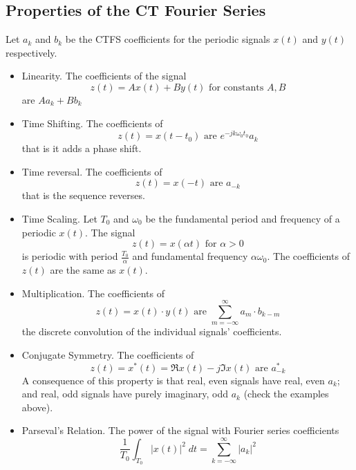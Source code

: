 \subsection{Properties of the CT Fourier Series}

Let $a_k$ and $b_k$ be the CTFS coefficients for the periodic signals $x(t)$ and $y(t)$ respectively.

\begin{itemize}
\item Linearity. The coefficients of the signal
  \[
  z(t) = Ax(t) + By(t) \mbox{ for constants } A,B 
  \]
  are $Aa_k + Bb_k$
\item Time Shifting. The coefficients of
  \[
  z(t) = x(t-t_0) \mbox{ are } e^{-jk\omega_0 t_0}a_k
  \]
  that is it adds a phase shift.
\item Time reversal. The coefficients of
  \[
  z(t) = x(-t) \mbox{ are } a_{-k}
  \]
  that is the sequence reverses.
\item Time Scaling. Let $T_0$ and $\omega_0$ be the fundamental period and frequency of a periodic $x(t)$. The signal 
  \[
  z(t) = x(\alpha t) \mbox{ for } \alpha > 0
  \]
  is periodic with period $\frac{T_0}{\alpha}$ and fundamental frequency $\alpha\omega_0$.
  The coefficients of $z(t)$ are the same as $x(t)$.
\item Multiplication. The coefficients of
  \[
  z(t) = x(t) \cdot y(t) \mbox{ are } \sum\limits_{m = -\infty}^{\infty} a_m\cdot b_{k-m}
  \]
  the discrete convolution of the individual signals' coefficients.
\item Conjugate Symmetry. The coefficients of
  \[
  z(t) = x^*(t) = \Re{x(t)} - j\Im{x(t)} \mbox{ are } a_{-k}^*
  \]
  A consequence of this property is that real, even signals have real, even $a_k$; and real, odd signals have purely imaginary, odd $a_k$ (check the examples above).
\item Parseval's Relation. The power of the signal with Fourier series coefficients
  \[
  \frac{1}{T_0} \int_{T_0} |x(t)|^2\;dt = \sum\limits_{k = -\infty}^{\infty} |a_k|^2
  \]
\end{itemize}




